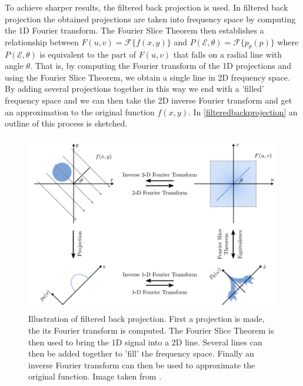 To achieve sharper results, the filtered back projection is used. In filtered back projection the obtained projections are taken into frequency space by computing the 1D Fourier transform. The Fourier Slice Theorem then establishes a relationship between $F(u,v) = \mathcal{F}\{f(x,y)\}$ and $P(\mathcal{E},\theta) = \mathcal{F}\{p_{\theta}(p)\}$ where $P(\mathcal{E},\theta)$ is equivalent to the part of $F(u,v)$ that falls on a radial line with angle $\theta$. That is, by computing the Fourier transform of the 1D projections and using the Fourier Slice Theorem, we obtain a single line in 2D frequency space. By adding several projections together in this way we end with a 'filled' frequency space and we can then take the 2D inverse Fourier transform and get an approximation to the original function $f(x,y)$. In \autoref{filteredbackprojection} an outline of this process is sketched.\\
\begin{figure}
	\centering
	\includegraphics[width=\linewidth]{Materials/filteredbackprojection}
	\caption{Illustration of filtered back projection. First a projection is made, the its Fourier transform is computed. The Fourier Slice Theorem is then used to bring the 1D signal into a 2D line. Several lines can then be added together to 'fill' the frequency space. Finally an inverse Fourier transform can then be used to approximate the original function. Image taken from \cite{MIS}.}
	\label{filteredbackprojection}
\end{figure}
